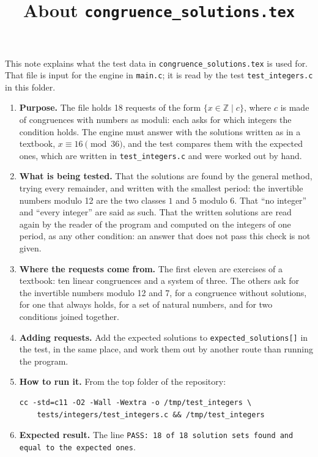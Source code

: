 \documentclass[11pt,a4paper]{article}
\title{About \texttt{congruence\_solutions.tex}}
\author{}
\date{}
\begin{document}
\maketitle
This note explains what the test data in \texttt{congruence\_solutions.tex} is used for. That file is input for the engine in \texttt{main.c}; it is read by the test \texttt{test\_integers.c} in this folder.

\begin{enumerate}
\item \textbf{Purpose.} The file holds 18 requests of the form $\{x \in \mathbb{Z} \mid c\}$, where $c$ is made of congruences with numbers as moduli: each asks for which integers the condition holds. The engine must answer with the solutions written as in a textbook, $x \equiv 16 \pmod{36}$, and the test compares them with the expected ones, which are written in \texttt{test\_integers.c} and were worked out by hand.

\item \textbf{What is being tested.} That the solutions are found by the general method, trying every remainder, and written with the smallest period: the invertible numbers modulo 12 are the two classes $1$ and $5$ modulo 6. That ``no integer'' and ``every integer'' are said as such. That the written solutions are read again by the reader of the program and computed on the integers of one period, as any other condition: an answer that does not pass this check is not given.

\item \textbf{Where the requests come from.} The first eleven are exercises of a textbook: ten linear congruences and a system of three. The others ask for the invertible numbers modulo 12 and 7, for a congruence without solutions, for one that always holds, for a set of natural numbers, and for two conditions joined together.

\item \textbf{Adding requests.} Add the expected solutions to \texttt{expected\_solutions[]} in the test, in the same place, and work them out by another route than running the program.

\item \textbf{How to run it.} From the top folder of the repository:
\begin{verbatim}
cc -std=c11 -O2 -Wall -Wextra -o /tmp/test_integers \
    tests/integers/test_integers.c && /tmp/test_integers
\end{verbatim}

\item \textbf{Expected result.} The line \texttt{PASS: 18 of 18 solution sets found and equal to the expected ones}.
\end{enumerate}
\end{document}
